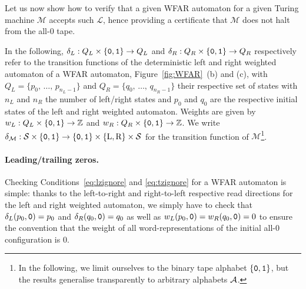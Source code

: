 Let us now show how to verify that a given WFAR automaton for a given Turing machine $\mathcal{M}$ accepts such $\mathcal{L}$, hence providing a certificate that $\mathcal{M}$ does not halt from the all-0 tape.

In the following, $\delta_L: Q_L \times \left\{\texttt{0},\texttt{1}\right\} \to Q_L$ and $\delta_R: Q_R \times \left\{\texttt{0},\texttt{1}\right\} \to Q_R$ respectively refer to the transition functions of the deterministic left and right weighted automaton of a WFAR automaton, \eg Figure~\ref{fig:WFAR}~(b) and (c), with $Q_L = \{p_0, \, \dots, \, p_{n_L-1}\}$ and $Q_R = \{q_0, \, \dots, \, q_{n_R-1}\}$ their respective set of states with $n_L$ and $n_R$ the number of left/right states and $p_0$ and $q_0$ are the respective initial states of the left and right weighted automaton. Weights are given by $w_L: Q_L \times \left\{\texttt{0},\texttt{1}\right\} \to \mathbb{Z}$ and $w_R: Q_R \times \left\{\texttt{0},\texttt{1}\right\} \to \mathbb{Z}$. We write $\delta_\mathcal{M}:\mathcal{S} \times \left\{\texttt{0},\texttt{1}\right\} \to \left\{\texttt{0},\texttt{1}\right\} \times \{\text{L},\text{R}\} \times \mathcal{S}$ for the transition function of $\mathcal{M}$\footnote{In the following, we limit ourselves to the binary tape alphabet $\left\{\texttt{0},\texttt{1}\right\}$, but the results generalise transparently to arbitrary alphabets $\mathcal{A}$.}.

\paragraph{Leading/trailing zeros.} Checking Conditions~\eqref{eq:lzignore} and \eqref{eq:tzignore} for a WFAR automaton is simple: thanks to the left-to-right and right-to-left respective read directions for the left and right weighted automaton, we simply have to check that $\delta_L(p_0,\texttt{0}) = p_0$ and $\delta_R(q_0,\texttt{0}) = q_0$ as well as $w_L(p_0,\texttt{0}) = w_R(q_0,\texttt{0}) = 0$ to ensure the convention that the weight of all word-representations of the initial all-0 configuration is 0.

